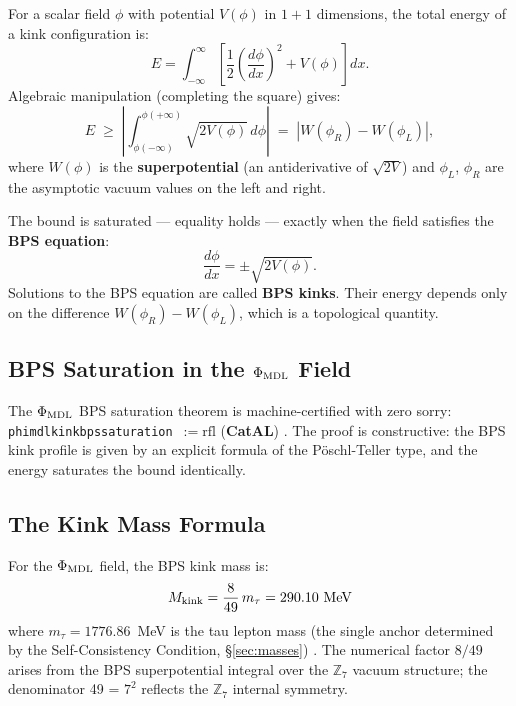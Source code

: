 \documentclass[11pt,a4paper]{article}
\newcommand{\term}[1]{\textbf{#1}}
\newcommand{\lean}[1]{%
  \penalty-100
  \begingroup\def\_{\textunderscore\allowbreak}\texttt{#1}\endgroup}
\newcommand{\CatAL}{\textbf{CatAL}}
\newcommand{\Mkink}{M_{\rm kink}}
\begin{document}
For a scalar field $\phi$ with potential $V(\phi)$ in $1{+}1$ dimensions, the
total energy of a kink configuration is:
\begin{equation}
  E = \int_{-\infty}^{\infty} \left[\frac{1}{2}\left(\frac{d\phi}{dx}\right)^2
      + V(\phi)\right] dx.
  \label{eq:kink_energy}
\end{equation}
Algebraic manipulation (completing the square) gives:
\begin{equation}
  E \;\geq\; \left|\int_{\phi(-\infty)}^{\phi(+\infty)} \sqrt{2V(\phi)}\,d\phi\right|
      \;=\; |W(\phi_R) - W(\phi_L)|,
  \label{eq:bogomolny_bound}
\end{equation}
where $W(\phi)$ is the \term{superpotential} (an antiderivative of $\sqrt{2V}$)
and $\phi_L$, $\phi_R$ are the asymptotic vacuum values on the left and right.

The bound is saturated — equality holds — exactly when the field satisfies the
\term{BPS equation}:
\begin{equation}
  \frac{d\phi}{dx} = \pm\sqrt{2V(\phi)}.
  \label{eq:bps_eq}
\end{equation}
Solutions to the BPS equation are called \term{BPS kinks}.  Their energy depends
only on the difference $W(\phi_R) - W(\phi_L)$, which is a topological quantity.

\subsection[BPS Saturation in the Phi-MDL Field]{BPS Saturation in the $\Phi_{\rm MDL}$ Field}

The $\Phi_{\rm MDL}$ BPS saturation theorem is machine-certified with zero sorry:
\lean{phi\_mdl\_kink\_bps\_saturation}~$:= \mathrm{rfl}$ (\CatAL)
\cite{SpivackGTECompleteFramework}.  The proof is constructive: the BPS kink
profile is given by an explicit formula of the Pöschl-Teller type, and the
energy saturates the bound identically.

\subsection{The Kink Mass Formula}
\label{subsec:kink_mass}

For the $\Phi_{\rm MDL}$ field, the BPS kink mass is:
\begin{equation}
  \Mkink = \frac{8}{49}\,m_\tau = 290.10~\text{MeV}
  \label{eq:kink_mass}
\end{equation}
where $m_\tau = 1776.86$~MeV is the tau lepton mass (the single anchor
determined by the Self-Consistency Condition, \S\ref{sec:masses})
\cite{SpivackGTECompleteFramework}.  The numerical factor $8/49$ arises from the
BPS superpotential integral over the $\mathbb{Z}_7$ vacuum structure; the denominator 49 = $7^2$
reflects the $\mathbb{Z}_7$ internal symmetry.
\end{document}
